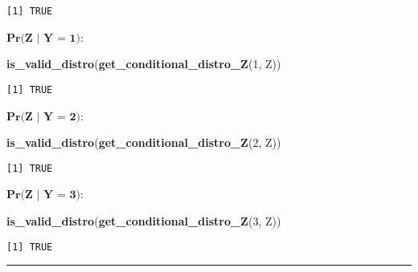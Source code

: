 \documentclass[
]{article}
\newenvironment{Shaded}{\begin{snugshade}}{\end{snugshade}}
\newcommand{\DecValTok}[1]{\textcolor[rgb]{0.00,0.00,0.81}{#1}}
\newcommand{\FunctionTok}[1]{\textcolor[rgb]{0.13,0.29,0.53}{\textbf{#1}}}
\newcommand{\NormalTok}[1]{#1}
\begin{document}
\begin{verbatim}
[1] TRUE
\end{verbatim}

\vspace{0.5cm}

\(\textbf{Pr(Z | Y = 1)}\):

\begin{Shaded}
\begin{Highlighting}[]
\FunctionTok{is\_valid\_distro}\NormalTok{(}\FunctionTok{get\_conditional\_distro\_Z}\NormalTok{(}\DecValTok{1}\NormalTok{, Z))}
\end{Highlighting}
\end{Shaded}

\begin{verbatim}
[1] TRUE
\end{verbatim}

\(\textbf{Pr(Z | Y = 2)}\):

\begin{Shaded}
\begin{Highlighting}[]
\FunctionTok{is\_valid\_distro}\NormalTok{(}\FunctionTok{get\_conditional\_distro\_Z}\NormalTok{(}\DecValTok{2}\NormalTok{, Z))}
\end{Highlighting}
\end{Shaded}

\begin{verbatim}
[1] TRUE
\end{verbatim}

\vspace{0.5cm}

\(\textbf{Pr(Z | Y = 3)}\):

\begin{Shaded}
\begin{Highlighting}[]
\FunctionTok{is\_valid\_distro}\NormalTok{(}\FunctionTok{get\_conditional\_distro\_Z}\NormalTok{(}\DecValTok{3}\NormalTok{, Z))}
\end{Highlighting}
\end{Shaded}

\begin{verbatim}
[1] TRUE
\end{verbatim}

\begin{center}\rule{0.5\linewidth}{0.5pt}\end{center}
\end{document}
